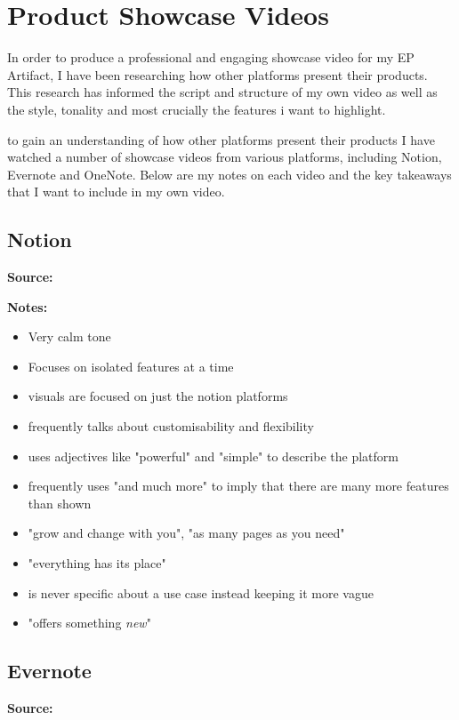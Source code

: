 \section{Product Showcase Videos}
\label{research:ProductShowcaseVideos}
In order to produce a professional and engaging showcase video for my EP Artifact, I have been researching how other platforms present their products. This research has informed the script and structure of my own video as well as the style, tonality and most crucially the features i want to highlight.

to gain an understanding of how other platforms present their products I have watched a number of showcase videos from various platforms, including Notion, Evernote and OneNote. Below are my notes on each video and the key takeaways that I want to include in my own video.

\subsection*{Notion}
\textbf{Source:} \cite{notionWhatNotion2020}

\textbf{Notes:}

\begin{itemize}
    \item Very calm tone
    \item Focuses on isolated features at a time
    \item visuals are focused on just the notion platforms
    \item frequently talks about customisability and flexibility
    \item uses adjectives like "powerful" and "simple" to describe the platform
    \item frequently uses "and much more" to imply that there are many more features than shown
    \item "grow and change with you", "as many pages as you need"
    \item "everything has its place"
    \item is never specific about a use case instead keeping it more vague
    \item "offers something \textit{new}"
\end{itemize}

\subsection*{Evernote}
\textbf{Source:} \cite{**384Evernote}


